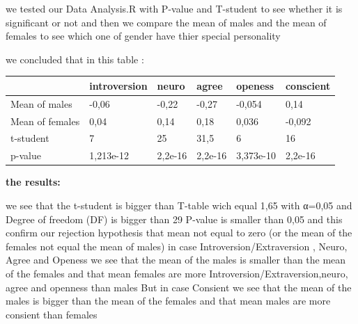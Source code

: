 we tested our Data Analysis.R with P-value and T-student  to see whether it is significant or not  and then we compare  the mean of males and the mean of  females  to see which one of gender have thier special personality 

we concluded that in this table :

\begin{table}[ht]
    \begin{center}
        {\footnotesize
        \begin{tabular}{l|l|l|l|l|l|}
        \hline \hline
               & introversion   & neuro    & agree   & openess   & conscient        \\
            \hline
                Mean of males    & -0,06 & -0,22   & -0,27 & -0,054 & 0,14   \\
                Mean of females  & 0,04 & 0,14 & 0,18 & 0,036 & -0,092  \\
                t-student        & 7 & 25 & 31,5 & 6 & 16   \\
                p-value          & 1,213e-12 & 2,2e-16 & 2,2e-16 & 3,373e-10 & 2,2e-16   \\
               
            \hline \hline
        \end{tabular}}
    \end{center}
    
\end{table}

{\normalsize{\bf the results:}} \\\vspace{0.5cm}


we see that the t-student is bigger than T-table wich equal 1,65  with α=0,05     and  Degree of freedom (DF) is bigger than 29
  P-value is smaller than 0,05
and this confirm our rejection hypothesis that mean not equal to zero (or the mean of the females not equal the mean of males) 
  in case Introversion/Extraversion , Neuro, Agree and Openess
we see that the mean of the males is smaller than  the mean of  the females and that mean females are more Introversion/Extraversion,neuro, agree and openness than males
But in case Consient we see that the mean of the males is bigger than  the mean of  the females and that mean males are more consient than females 





